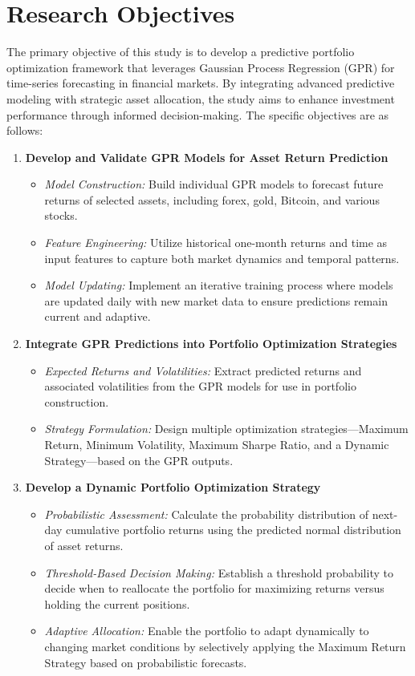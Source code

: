 \section{Research Objectives}
The primary objective of this study is to develop a predictive portfolio optimization framework that leverages Gaussian Process Regression (GPR) for time-series forecasting in financial markets. 
By integrating advanced predictive modeling with strategic asset allocation, the study aims to enhance investment performance through informed decision-making. 
The specific objectives are as follows:

\begin{enumerate}
    \item \textbf{Develop and Validate GPR Models for Asset Return Prediction}
    \begin{itemize}
        \item \emph{Model Construction:} Build individual GPR models to forecast future returns of selected assets, including forex, gold, Bitcoin, and various stocks.
        \item \emph{Feature Engineering:} Utilize historical one-month returns and time as input features to capture both market dynamics and temporal patterns.
        \item \emph{Model Updating:} Implement an iterative training process where models are updated daily with new market data to ensure predictions remain current and adaptive.
    \end{itemize}
    
    \item \textbf{Integrate GPR Predictions into Portfolio Optimization Strategies}
    \begin{itemize}
        \item \emph{Expected Returns and Volatilities:} Extract predicted returns and associated volatilities from the GPR models for use in portfolio construction.
        \item \emph{Strategy Formulation:} Design multiple optimization strategies---Maximum Return, Minimum Volatility, Maximum Sharpe Ratio, and a Dynamic Strategy---based on the GPR outputs.
    \end{itemize}
    
    \item \textbf{Develop a Dynamic Portfolio Optimization Strategy}
    \begin{itemize}
        \item \emph{Probabilistic Assessment:} Calculate the probability distribution of next-day cumulative portfolio returns using the predicted normal distribution of asset returns.
        \item \emph{Threshold-Based Decision Making:} Establish a threshold probability to decide when to reallocate the portfolio for maximizing returns versus holding the current positions.
        \item \emph{Adaptive Allocation:} Enable the portfolio to adapt dynamically to changing market conditions by selectively applying the Maximum Return Strategy based on probabilistic forecasts.
    \end{itemize}
    

\end{enumerate}
